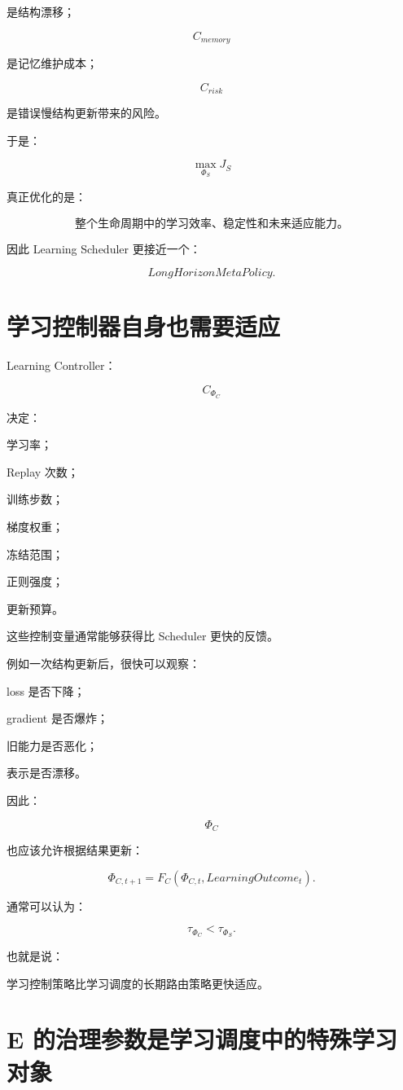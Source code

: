 是结构漂移；

\[
C_{memory}
\]

是记忆维护成本；

\[
C_{risk}
\]

是错误慢结构更新带来的风险。

于是：

\[
\boxed{
\max_{\Phi_S}J_S
}
\]

真正优化的是：

\[
\boxed{
\textbf{
整个生命周期中的学习效率、稳定性和未来适应能力。
}
}
\]

因此 Learning Scheduler 更接近一个：

\[
\boxed{
LongHorizonMetaPolicy.
}
\]


\section{学习控制器自身也需要适应}

Learning Controller：

\[
C_{\Phi_C}
\]

决定：

学习率；

Replay 次数；

训练步数；

梯度权重；

冻结范围；

正则强度；

更新预算。

这些控制变量通常能够获得比 Scheduler 更快的反馈。

例如一次结构更新后，很快可以观察：

loss 是否下降；

gradient 是否爆炸；

旧能力是否恶化；

表示是否漂移。

因此：

\[
\boxed{
\Phi_C
}
\]

也应该允许根据结果更新：

\[
\boxed{
\Phi_{C,t+1}
=
F_C
(
\Phi_{C,t},
LearningOutcome_t
).
}
\]

通常可以认为：

\[
\boxed{
\tau_{\Phi_C}
<
\tau_{\Phi_S}.
}
\]

也就是说：

学习控制策略比学习调度的长期路由策略更快适应。


\section{E 的治理参数是学习调度中的特殊学习对象}

